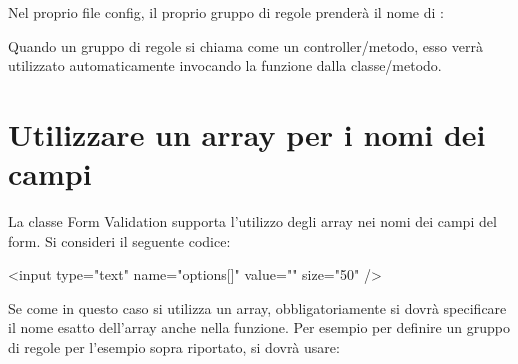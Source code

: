 
Nel proprio file config, il proprio gruppo di regole prenderà il nome di :


Quando un gruppo di regole si chiama come un controller/metodo, esso verrà utilizzato automaticamente invocando la funzione  dalla classe/metodo.

\label{sec:arraynomicampi}
\section*{Utilizzare un array per i nomi dei campi}
La classe Form Validation supporta l'utilizzo degli array nei nomi dei campi del form. Si consideri il seguente codice:

\begin{code}
<input type="text" name="options[]" value="" size="50" />
\end{code}

Se come in questo caso si utilizza un array, obbligatoriamente si dovrà specificare il nome esatto dell'array anche nella funzione. Per esempio per definire un gruppo di regole per l'esempio sopra riportato, si dovrà usare:

